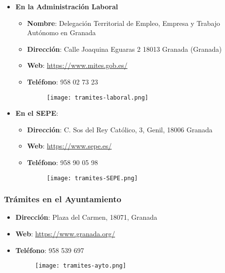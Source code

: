 \begin{itemize}
    \item \textbf{En la Administración Laboral}
    \begin{itemize}
        \item \textbf{Nombre}: Delegación Territorial de Empleo, Empresa y Trabajo Autónomo en Granada
        \item \textbf{Dirección}: Calle Joaquina Eguaras 2 18013 Granada (Granada)
        \item \textbf{Web}: \url{https://www.mites.gob.es/}
        \item \textbf{Teléfono}: 958 02 73 23

        \begin{figure}[H]
            \centering
            \texttt{[image: tramites-laboral.png]}
        \end{figure}
    \end{itemize}
    \item \textbf{En el SEPE}:
    \begin{itemize}
        \item \textbf{Dirección}:  C. Sos del Rey Católico, 3, Genil, 18006 Granada
        \item \textbf{Web}: \url{https://www.sepe.es/}
        \item \textbf{Teléfono}: 958 90 05 98

        \begin{figure}[H]
            \centering
            \texttt{[image: tramites-SEPE.png]}
        \end{figure}
    \end{itemize}
\end{itemize}

\subsubsection*{Trámites en el Ayuntamiento}
\begin{itemize}
    \item \textbf{Dirección}:  Plaza del Carmen, 18071, Granada
    \item \textbf{Web}: \url{https://www.granada.org/}
    \item \textbf{Teléfono}: 958 539 697

    \begin{figure}[H]
        \centering
        \texttt{[image: tramites-ayto.png]}
    \end{figure}
\end{itemize}

